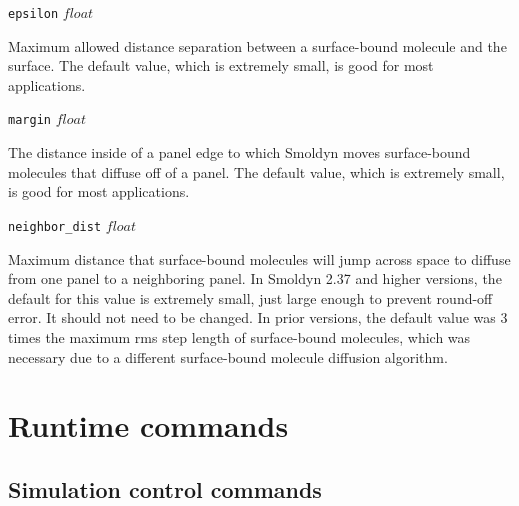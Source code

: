 \documentclass {scrbook}
\newcommand {\ttt} {\texttt}
\begin{document}
\begin{description}
\item{\ttt{epsilon} $float$}

Maximum allowed distance separation between a surface-bound molecule and the surface. The default value, which is extremely small, is good for most applications.

\item{\ttt{margin} $float$}

The distance inside of a panel edge to which Smoldyn moves surface-bound molecules that diffuse off of a panel. The default value, which is extremely small, is good for most applications.

\item{\ttt{neighbor\_dist} $float$}

Maximum distance that surface-bound molecules will jump across space to diffuse from one panel to a neighboring panel. In Smoldyn 2.37 and higher versions, the default for this value is extremely small, just large enough to prevent round-off error. It should not need to be changed. In prior versions, the default value was 3 times the maximum rms step length of surface-bound molecules, which was necessary due to a different surface-bound molecule diffusion algorithm.

\end{description}



\chapter{Runtime commands}

\section{Simulation control commands}
\end{document}
